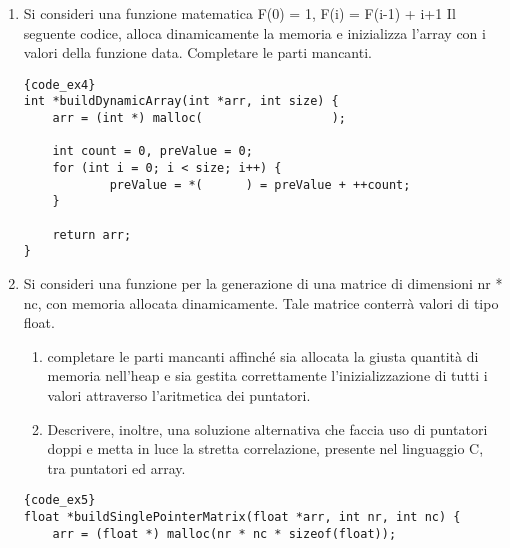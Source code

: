 \begin{enumerate}

\vspace{1.5cm}
\item {} Si consideri una funzione matematica F(0) = 1, F(i) = F(i-1) + i+1 Il seguente codice, alloca dinamicamente la memoria e inizializza l’array con i valori della funzione data. Completare le parti mancanti.

\begin{minipage}{.60\textwidth}
\begin{lstlisting}{code_ex4}
int *buildDynamicArray(int *arr, int size) {
    arr = (int *) malloc(                  );

    int count = 0, preValue = 0; 
    for (int i = 0; i < size; i++) {
            preValue = *(      ) = preValue + ++count;
    }

    return arr;
}
\end{lstlisting}
\end{minipage}\hfill
\begin{minipage}[t]{.35\textwidth}
\end{minipage}


\clearpage
\item {} Si consideri una funzione per la generazione di una matrice di dimensioni nr * nc, con memoria allocata dinamicamente. Tale matrice conterrà valori di tipo float.
     \begin{enumerate} 
        \item completare le parti mancanti affinché sia allocata la giusta quantità di memoria nell’heap e sia gestita correttamente l’inizializzazione di tutti i valori attraverso l’aritmetica dei puntatori.
        \item Descrivere, inoltre, una soluzione alternativa che faccia uso di puntatori doppi e metta in luce la stretta correlazione, presente nel linguaggio C, tra puntatori ed array.
     \end{enumerate} 
\begin{minipage}{.45\textwidth}
\begin{lstlisting}{code_ex5}
float *buildSinglePointerMatrix(float *arr, int nr, int nc) {
    arr = (float *) malloc(nr * nc * sizeof(float));


\end{lstlisting}
\end{minipage}
\end{enumerate}
